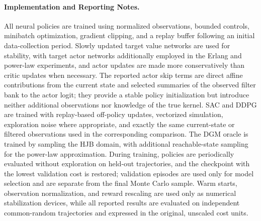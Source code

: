 \documentclass[11pt]{article}
\theoremstyle{remarkitalic}
\theoremstyle{remarkitalic}
\newcommand{\1}{\mathbf 1}
\begin{document}
\paragraph{Implementation and Reporting Notes.}
All neural policies are trained using normalized observations, bounded controls, minibatch optimization, gradient clipping, and a replay buffer following an initial data-collection period. Slowly updated target value networks are used for stability, with target actor networks additionally employed in the Erlang and power-law experiments, and actor updates are made more conservatively than critic updates when necessary. The reported actor skip terms are direct affine contributions from the current state and selected summaries of the observed filter bank to the actor logit; they provide a stable policy initialization but introduce neither additional observations nor knowledge of the true kernel. SAC and DDPG are trained with replay-based off-policy updates, vectorized simulation, exploration noise where appropriate, and exactly the same current-state or filtered observations used in the corresponding comparison. The DGM oracle is trained by sampling the HJB domain, with additional reachable-state sampling for the power-law approximation. During training, policies are periodically evaluated without exploration on held-out trajectories, and the checkpoint with the lowest validation cost is restored; validation episodes are used only for model selection and are separate from the final Monte Carlo sample. Warm starts, observation normalization, and reward rescaling are used only as numerical stabilization devices, while all reported results are evaluated on independent common-random trajectories and expressed in the original, unscaled cost units.
\end{document}
